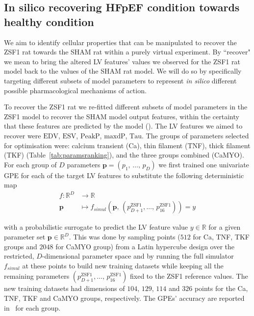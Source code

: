 %
%
%
\subsection{In silico recovering HFpEF condition towards healthy condition}\label{sec:recovery}
We aim to identify cellular properties that can be manipulated to recover the ZSF1 rat towards the SHAM rat within a purely virtual experiment. By ``recover" we mean to bring the altered LV features' values we observed for the ZSF1 rat model back to the values of the SHAM rat model. We will do so by specifically targeting different subsets of model parameters to represent \textit{in silico} different possible pharmacological mechanisms of action.

\vspace{0.2cm}
To recover the ZSF1 rat we re-fitted different subsets of model parameters in the ZSF1 model to recover the SHAM model output features, within the certainty that these features are predicted by the model (). The LV features we aimed to recover were $\textrm{EDV}$, $\textrm{ESV}$, $\textrm{PeakP}$, $\textrm{maxdP}$, $\textrm{Tau}$. The groups of parameters selected for optimisation were: calcium transient (Ca), thin filament (TNF), thick filament (TKF) (Table~\ref{tab:paramsranking}), and the three groups combined (CaMYO). For each group of $D$ parameters $\mathbf{p}=(p_1,\,\dots,\,p_D)$ we first trained one univariate GPE for each of the target LV features to substitute the following deterministic map
%
\begin{align}
    f\colon\mathbb{R}^D &\to \mathbb{R} \\
    \mathbf{p} &\mapsto f_{simul}(\mathbf{p},\,(p_{D+1}^{\textrm{ZSF1}},\dots,\,p_{16}^{\textrm{ZSF1}}))=y
\end{align}

\noindent
with a probabilistic surrogate to predict the LV feature value $y\in\mathbb{R}$ for a given parameter set $\mathbf{p}\in\mathbb{R}^D$. This was done by sampling points ($512$ for Ca, TNF, TKF groups and $2048$ for CaMYO group) from a Latin hypercube design over the restricted, $D$-dimensional parameter space and by running the full simulator $f_{simul}$ at these points to build new training datasets while keeping all the remaining parameters $(p_{D+1}^{\textrm{ZSF1}},\dots,\,p_{16}^{\textrm{ZSF1}})$ fixed to the ZSF1 reference values. The new training datasets had dimensions of $104$, $129$, $114$ and $326$ points for the Ca, TNF, TKF and CaMYO groups, respectively. The GPEs' accuracy are reported in~ for each group.

